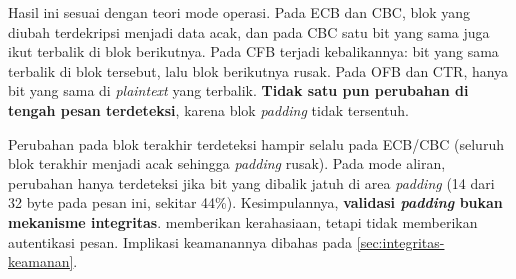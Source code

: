Hasil ini sesuai dengan teori mode operasi. Pada ECB dan CBC, blok yang diubah terdekripsi menjadi data acak, dan pada CBC satu bit yang sama juga ikut terbalik di blok berikutnya. Pada CFB terjadi kebalikannya: bit yang sama terbalik di blok tersebut, lalu blok berikutnya rusak. Pada OFB dan CTR, hanya bit yang sama di \textit{plaintext} yang terbalik. \textbf{Tidak satu pun perubahan di tengah pesan terdeteksi}, karena blok \textit{padding} tidak tersentuh.

Perubahan pada blok terakhir terdeteksi hampir selalu pada ECB/CBC (seluruh blok terakhir menjadi acak sehingga \textit{padding} rusak). Pada mode aliran, perubahan hanya terdeteksi jika bit yang dibalik jatuh di area \textit{padding} (14 dari 32 byte pada pesan ini, sekitar 44\%). Kesimpulannya, \textbf{validasi \textit{padding} bukan mekanisme integritas}. \algname{} memberikan kerahasiaan, tetapi tidak memberikan autentikasi pesan. Implikasi keamanannya dibahas pada \cref{sec:integritas-keamanan}.

